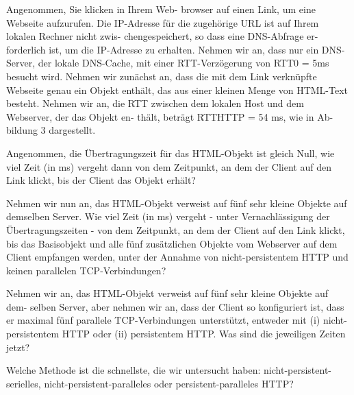 \Aufgabenstellung%
Angenommen, Sie klicken in Ihrem Web-
browser auf einen Link, um eine Webseite
aufzurufen. Die IP-Adresse für die zugehörige
URL ist auf Ihrem lokalen Rechner nicht zwis-
chengespeichert, so dass eine DNS-Abfrage er-
forderlich ist, um die IP-Adresse zu erhalten.
Nehmen wir an, dass nur ein DNS-Server, der
lokale DNS-Cache, mit einer RTT-Verzögerung
von RTT0 = 5ms besucht wird. Nehmen wir
zunächst an, dass die mit dem Link verknüpfte
Webseite genau ein Objekt enthält, das aus
einer kleinen Menge von HTML-Text besteht.
Nehmen wir an, die RTT zwischen dem lokalen
Host und dem Webserver, der das Objekt en-
thält, beträgt RTTHTTP = 54 ms, wie in Ab-
bildung 3 dargestellt.


\Teilaufgabe%
Angenommen, die Übertragungszeit für das HTML-Objekt ist gleich Null, wie viel
Zeit (in ms) vergeht dann von dem Zeitpunkt, an dem der Client auf den Link
klickt, bis der Client das Objekt erhält?


\Teilaufgabe%
Nehmen wir nun an, das HTML-Objekt verweist auf fünf sehr kleine Objekte auf
demselben Server. Wie viel Zeit (in ms) vergeht - unter Vernachlässigung der
Übertragungszeiten - von dem Zeitpunkt, an dem der Client auf den Link klickt,
bis das Basisobjekt und alle fünf zusätzlichen Objekte vom Webserver auf dem
Client empfangen werden, unter der Annahme von nicht-persistentem HTTP und
keinen parallelen TCP-Verbindungen?


\Teilaufgabe%
Nehmen wir an, das HTML-Objekt verweist auf fünf sehr kleine Objekte auf dem-
selben Server, aber nehmen wir an, dass der Client so konfiguriert ist, dass er
maximal fünf parallele TCP-Verbindungen unterstützt, entweder mit (i) nicht-
persistentem HTTP oder (ii) persistentem HTTP. Was sind die jeweiligen Zeiten
jetzt?


\Teilaufgabe%
Welche Methode ist die schnellste, die wir untersucht haben: nicht-persistent-
serielles, nicht-persistent-paralleles oder persistent-paralleles HTTP?




